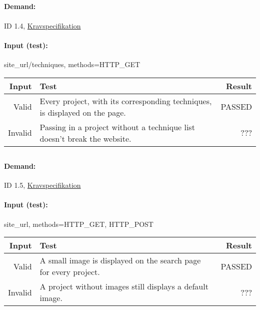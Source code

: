\documentclass{TDP003mall}
\begin{document}
\subsection{}
\paragraph{Demand: }ID 1.4, \href{https://www.ida.liu.se/~TDP003/current/projekt/dokument/systemspecifikation.pdf}{Kravspecifikation}
\paragraph{Input (test):}
site\_url/techniques,  methods=HTTP\_GET

\begin{table}[!h]
\begin{tabularx}{\linewidth}{|r|X|r|}\hline
\textbf{Input} & \textbf{Test} & \textbf{ Result} \\\hline
Valid & Every project, with its corresponding techniques, is displayed on the page. & PASSED \\\hline
Invalid & Passing in a project without a technique list doesn't break the
website. & ??? \\\hline
\end{tabularx}
\end{table}

\subsection{}
\paragraph{Demand: }ID 1.5, \href{https://www.ida.liu.se/~TDP003/current/projekt/dokument/systemspecifikation.pdf}{Kravspecifikation}
\paragraph{Input (test):}
site\_url,  methods=HTTP\_GET, HTTP\_POST

\begin{table}[!h]
\begin{tabularx}{\linewidth}{|r|X|r|}\hline
\textbf{Input} & \textbf{Test} & \textbf{ Result} \\\hline
Valid & A small image is displayed on the search page for every project. & PASSED \\\hline
Invalid & A project without images still displays a default image. & ??? \\\hline
\end{tabularx}
\end{table}
\newpage
\end{document}
